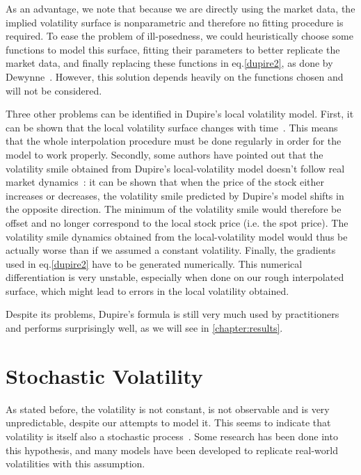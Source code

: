As an advantage, we note that because we are directly using the market data, the implied volatility surface is nonparametric and therefore no fitting procedure is required. To ease the problem of ill-posedness, we could heuristically choose some functions to model this surface, fitting their parameters to better replicate the market data, and finally replacing these functions in eq.\eqref{dupire2}, as done by Dewynne~\citep{dewynne}. However, this solution depends heavily on the functions chosen and will not be considered.



Three other problems can be identified in Dupire's local volatility model.
First, it can be shown that the local volatility surface changes with time~\citep{Wilmott}. This means that the whole interpolation procedure must be done regularly in order for the model to work properly.
Secondly, some authors have pointed out that the volatility smile obtained from Dupire's local-volatility model doesn't follow real market dynamics~\citep{Hagan}: it can be shown that when the price of the stock either increases or decreases, the volatility smile predicted by Dupire's model shifts in the opposite direction. The minimum of the volatility smile would therefore be offset and no longer correspond to the local stock price (i.e. the spot price). The volatility smile dynamics obtained from the local-volatility model would thus be actually worse than if we assumed a constant volatility.
Finally, the gradients used in eq.\eqref{dupire2} have to be generated numerically. This numerical differentiation is very unstable, especially when done on our rough interpolated surface, which might lead to errors in the local volatility obtained.

Despite its problems, Dupire's formula is still very much used by practitioners and performs surprisingly well, as we will see in \autoref{chapter:results}.



\section{Stochastic Volatility}
\label{section:stochastic volatility}
As stated before, the volatility is not constant, is not observable and is very unpredictable, despite our attempts to model it. This seems to indicate that volatility is itself also a stochastic process~\citep{rebonato}. Some research has been done into this hypothesis, and many models have been developed to replicate real-world volatilities with this assumption.

